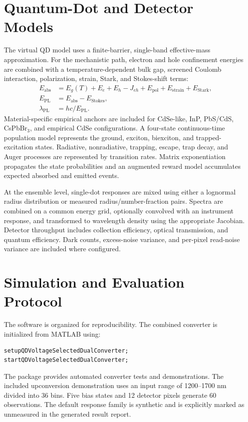 \documentclass[conference]{IEEEtran}
\begin{document}
\section{Quantum-Dot and Detector Models}
The virtual QD model uses a finite-barrier, single-band effective-mass approximation. For the mechanistic path, electron and hole confinement energies are combined with a temperature-dependent bulk gap, screened Coulomb interaction, polarization, strain, Stark, and Stokes-shift terms:
\begin{align}
 E_{\mathrm{abs}} &= E_g(T)+E_e+E_h-J_{eh}+E_{\mathrm{pol}}+E_{\mathrm{strain}}+E_{\mathrm{Stark}},\\
 E_{\mathrm{PL}} &= E_{\mathrm{abs}}-E_{\mathrm{Stokes}},\\
 \lambda_{\mathrm{PL}} &= hc/E_{\mathrm{PL}}.
\end{align}
Material-specific empirical anchors are included for CdSe-like, InP, PbS/CdS, CsPbBr$_3$, and empirical CdSe configurations. A four-state continuous-time population model represents the ground, exciton, biexciton, and trapped-excitation states. Radiative, nonradiative, trapping, escape, trap decay, and Auger processes are represented by transition rates. Matrix exponentiation propagates the state probabilities and an augmented reward model accumulates expected absorbed and emitted events.

At the ensemble level, single-dot responses are mixed using either a lognormal radius distribution or measured radius/number-fraction pairs. Spectra are combined on a common energy grid, optionally convolved with an instrument response, and transformed to wavelength density using the appropriate Jacobian. Detector throughput includes collection efficiency, optical transmission, and quantum efficiency. Dark counts, excess-noise variance, and per-pixel read-noise variance are included where configured.

\section{Simulation and Evaluation Protocol}
The software is organized for reproducibility. The combined converter is initialized from MATLAB using:
\begin{verbatim}
setupQDVoltageSelectedDualConverter;
startQDVoltageSelectedDualConverter;
\end{verbatim}
The package provides automated converter tests and demonstrations. The included upconversion demonstration uses an input range of 1200--1700 nm divided into 36 bins. Five bias states and 12 detector pixels generate 60 observations. The default response family is synthetic and is explicitly marked as unmeasured in the generated result report.
\end{document}
